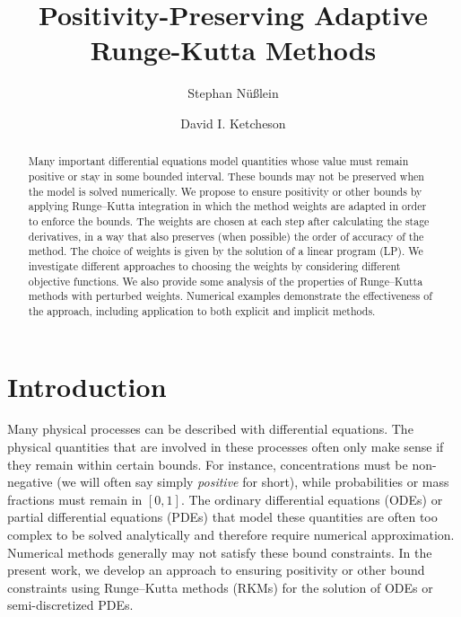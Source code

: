 \documentclass[a4paper]{article}
\title{Positivity-Preserving Adaptive Runge-Kutta Methods}
\author{Stephan Nüßlein \and David I. Ketcheson}
\numberwithin{equation}{section}
\theoremstyle{plain}
\theoremstyle{definition}
\numberwithin{theorem}{section}
\newcommand{\1}{\mathbbm{1}}
\begin{document}
\maketitle

\begin{abstract}
Many important differential equations model quantities whose value
must remain positive or stay in some bounded interval.
These bounds may not be preserved when the model is solved numerically.
We propose to ensure positivity or other bounds by applying Runge--Kutta
integration in which the method weights are adapted in order to
enforce the bounds.  The weights are chosen at each step after calculating the
stage derivatives, in a way that also preserves (when possible) the order of
accuracy of the method.  The choice of weights is given by the solution
of a linear program (LP).
We investigate different approaches to choosing the weights by considering
different objective functions.  We also provide some analysis of the properties
of Runge--Kutta methods with perturbed weights.  Numerical examples demonstrate
the effectiveness of the approach, including application to both explicit and
implicit methods.
\end{abstract}



\section{Introduction}


Many physical processes can be described with differential equations. 
The physical quantities that are involved in these processes often only make sense if they remain within certain bounds.
For instance, concentrations must be non-negative (we will often say simply {\em positive} for short), while
probabilities or mass fractions must remain in $[0,1]$.
The ordinary differential equations (ODEs) or partial differential equations
(PDEs) that model these quantities are often too complex to be solved
analytically and therefore require numerical approximation.
Numerical methods generally may not satisfy these bound constraints.
In the present work, we develop an approach to ensuring positivity
or other bound constraints using Runge--Kutta methods (RKMs) for the
solution of ODEs or semi-discretized PDEs.
\end{document}
